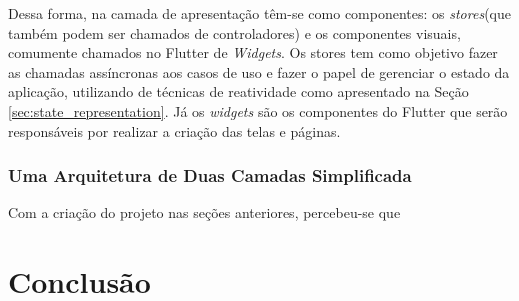 \documentclass[12pt, %
openright, 
oneside, %
a4paper,    %
brazil]{facom-ufu-abntex2}
\begin{document}
Dessa forma, na camada de apresentação têm-se como componentes: os \textit{stores}(que também podem ser chamados de controladores) e os componentes visuais, comumente chamados no Flutter de \textit{Widgets}. Os stores tem como objetivo fazer as chamadas assíncronas aos casos de uso e fazer o papel de gerenciar o estado da aplicação, utilizando de técnicas de reatividade como apresentado na Seção \ref{sec:state_representation}. Já os \textit{widgets} são os componentes do Flutter que serão responsáveis por realizar a criação das telas e páginas.


\subsection{Uma Arquitetura de Duas Camadas Simplificada} \label{subsec:simplified_arch}

Com a criação do projeto nas seções anteriores, percebeu-se que

\chapter{Conclusão}

\postextual



\end{document}
